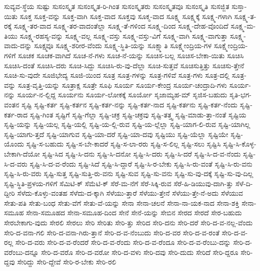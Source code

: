 {ಸುವ್ಯವ-ಸ್ಥೆಯ
ಸುಷ್ಟು
ಸುಸಂಸ್ಕೃತ
ಸುಸಂಸ್ಕೃತ-ರಿ-ಗಿಂತ
ಸುಸಂಸ್ಕೃತರು
ಸುಸಂಸ್ಕೃತವೂ
ಸುಸಂಸ್ಕೃತಿ
ಸುಸಜ್ಜಿತ
ಸುಸ್ತಾ-ಯಿತು
ಸೂಕ್ತ
ಸೂಕ್ತ-ವನ್ನು
ಸೂಕ್ತ-ವಾಗಿ
ಸೂಕ್ತ-ವಾದ
ಸೂಕ್ತವು
ಸೂಕ್ಮ-ವಾದ
ಸೂಕ್ಷ್ಮ
ಸೂಕ್ಷ್ಮಕ್ಕೆ
ಸೂಕ್ಷ್ಮ-ಗಳಾಗಿ
ಸೂಕ್ಷ್ಮ-ತ-ರಕ್ಕೆ
ಸೂಕ್ಷ್ಮ-ತರ-ವಾದ
ಸೂಕ್ಷ್ಮ-ತರ-ವಾದಂತೆಲ್ಲಾ
ಸೂಕ್ಷ್ಮ-ತೆ-ಗಳಿಂದ
ಸೂಕ್ಷ್ಮ-ದಿಂದ
ಸೂಕ್ಷ್ಮ-ದೇಹ-ವೊಂದಿದೆ
ಸೂಕ್ಷ್ಮ-ಮ-ತಿಯು
ಸೂಕ್ಷ್ಮ-ರಹಸ್ಯ-ವನ್ನು
ಸೂಕ್ಷ್ಮ-ವಲ್ಲ
ಸೂಕ್ಷ್ಮ-ವಸ್ತು
ಸೂಕ್ಷ್ಮ-ವಸ್ತು-ವಿಗೆ
ಸೂಕ್ಷ್ಮ-ವಾಗಿ
ಸೂಕ್ಷ್ಮ-ವಾಗುತ್ತಾ
ಸೂಕ್ಷ್ಮ-ವಾದು-ದನ್ನು
ಸೂಕ್ಷ್ಮವೂ
ಸೂಕ್ಷ್ಮ-ಶರೀರ-ವೆಂದು
ಸೂಕ್ಷ್ಮ-ಸ್ಥಿತಿ-ಯನ್ನು
ಸೂಕ್ಷ್ಮಾತಿ
ಸೂಕ್ಷ್ಮೇಂದ್ರಿಯ-ಗಳ
ಸೂಕ್ಷ್ಮೇಂದ್ರಿಯ-ಗಳಿಗೆ
ಸೂಚಕ
ಸೂಚಕ-ವಾಗಿದೆ
ಸೂಚ-ನೆ-ಗಳು
ಸೂಚ-ನೆ-ಯನ್ನು
ಸೂಚಿಸ-ಬಲ್ಲ
ಸೂಚಿಸ-ಬೇಕಾ-ಯಿತು
ಸೂಚಿಸಿ
ಸೂಚಿಸಿ-ದಂತೆ
ಸೂಚಿಸಿ-ದರು
ಸೂಚಿ-ಸಿದ್ದು
ಸೂಚಿಸಿ-ರು-ವು-ದೆಲ್ಲಾ
ಸೂಚಿ-ಸುತ್ತವೆ
ಸೂಚಿಸುತ್ತಿತ್ತು
ಸೂಚಿಸು-ತ್ತೇನೆ
ಸೂಚಿ-ಸು-ವುದೇ
ಸೂಜಿಭೇದ್ಯ
ಸೂಜಿ-ಯಿಂದ
ಸೂತ್ರ
ಸೂತ್ರ-ಗಳನ್ನು
ಸೂತ್ರ-ಗಳಿವೆ
ಸೂತ್ರ-ಗಳು
ಸೂತ್ರ-ದಲ್ಲಿ
ಸೂತ್ರ-ವನ್ನು
ಸೂತ್ರ-ವೃತ್ತಿ-ಯನ್ನು
ಸೂತ್ರಾಕ್ಷ
ಸೂತ್ರೇ
ಸೂಫಿ
ಸೂರ್ಯ
ಸೂರ್ಯ-ಕೇಂದ್ರ
ಸೂರ್ಯ-ಚಂದ್ರಾದಿ-ಗಳು
ಸೂರ್ಯ-ನನ್ನು
ಸೂರ್ಯ-ನ-ಲ್ಲಿದ್ದ
ಸೂರ್ಯನು
ಸೂರ್ಯ-ಲೋಕಕ್ಕೆ
ಸೂರ್ಯೋ
ಸೃಜಾಮ್ಯಹ-ಮ್
ಸೃಜಿಸ-ಬಹುದು
ಸೃತಿ-ಭಗ-ವಂತನ
ಸೃಷ್ಟಿ
ಸೃಷ್ಟಿ-ಕರ್ತ
ಸೃಷ್ಟಿ-ಕರ್ತನ
ಸೃಷ್ಟಿ-ಕರ್ತ-ನನ್ನು
ಸೃಷ್ಟಿ-ಕರ್ತ-ನಾದ
ಸೃಷ್ಟಿ-ಕರ್ತನು
ಸೃಷ್ಟಿ-ಕರ್ತ-ನೆಂದು
ಸೃಷ್ಟಿ-ಕರ್ತ-ರಾದ
ಸೃಷ್ಟಿ-ಗಿಂತ
ಸೃಷ್ಟಿಗೆ
ಸೃಷ್ಟಿ-ಗೆಲ್ಲಾ
ಸೃಷ್ಟಿ-ಚಕ್ರ
ಸೃಷ್ಟಿ-ಚಕ್ರವು
ಸೃಷ್ಟಿ-ತತ್ತ್ವ
ಸೃಷ್ಟಿ-ಮಾಡು-ತ್ತಾ-ನಂತೆ
ಸೃಷ್ಟಿಯ
ಸೃಷ್ಟಿ-ಯನ್ನು
ಸೃಷ್ಟಿ-ಯಲ್ಲ
ಸೃಷ್ಟಿ-ಯಲ್ಲಿ
ಸೃಷ್ಟಿ-ಯ-ಲ್ಲಿ-ರುವ
ಸೃಷ್ಟಿ-ಯ-ಲ್ಲೆಲ್ಲಾ
ಸೃಷ್ಟಿ-ಯಾಗ-ಲಿ-ರುವ
ಸೃಷ್ಟಿ-ಯಾಗಿಲ್ಲ
ಸೃಷ್ಟಿ-ಯಾಗು-ತ್ತದೆ
ಸೃಷ್ಟಿ-ಯಾಗುವ
ಸೃಷ್ಟಿ-ಯಾ-ದರೆ
ಸೃಷ್ಟಿ-ಯಾ-ದವು
ಸೃಷ್ಟಿಯು
ಸೃಷ್ಟಿ-ಯೆಲ್ಲಾ
ಸೃಷ್ಟಿಯೇ
ಸೃಷ್ಟಿ-ಯೊಂದು
ಸೃಷ್ಟಿ-ಸ-ಬಹುದು
ಸೃಷ್ಟಿ-ಸ-ಬೇ-ಕಾದರೆ
ಸೃಷ್ಟಿ-ಸ-ಲಾ-ರರು
ಸೃಷ್ಟಿ-ಸ-ಲಿಲ್ಲ
ಸೃಷ್ಟಿ-ಸಲು
ಸೃಷ್ಟಿಸಿ
ಸೃಷ್ಟಿ-ಸಿ-ಕೊಳ್ಳ-ಬೇಕಾಗಿ-ದೆಯೋ
ಸೃಷ್ಟಿ-ಸಿದ
ಸೃಷ್ಟಿ-ಸಿ-ದನು
ಸೃಷ್ಟಿ-ಸಿ-ದನೋ
ಸೃಷ್ಟಿ-ಸಿ-ದರು
ಸೃಷ್ಟಿ-ಸಿ-ದರೆ
ಸೃಷ್ಟಿ-ಸಿ-ದ-ವ-ನೆಂದು
ಸೃಷ್ಟಿ-ಸಿ-ದ-ವರು
ಸೃಷ್ಟಿ-ಸಿ-ದ-ವ-ರೆಂದು
ಸೃಷ್ಟಿ-ಸಿದೆ
ಸೃಷ್ಟಿ-ಸಿ-ದ್ದಾರೆ
ಸೃಷ್ಟಿ-ಸಿ-ರ-ಬೇಕು
ಸೃಷ್ಟಿ-ಸಿ-ರು-ವಂತೆ
ಸೃಷ್ಟಿ-ಸಿ-ರು-ವನು
ಸೃಷ್ಟಿ-ಸಿ-ರು-ವರು
ಸೃಷ್ಟಿ-ಸುತ್ತ
ಸೃಷ್ಟಿ-ಸುತ್ತಿ-ರು-ವನು
ಸೃಷ್ಟಿ-ಸುವ
ಸೃಷ್ಟಿ-ಸು-ವನು
ಸೃಷ್ಟಿ-ಸು-ವು-ದಕ್ಕೆ
ಸೃಷ್ಟಿ-ಸು-ವು-ದಿಲ್ಲ
ಸೃಷ್ಟಿ-ಸ್ಥಿತಿ-ಪ್ರಳಯ-ಗಳಿಗೆ
ಸೆಮಿಟಿ-ಕ್
ಸೆಮೆಟಿ-ಕ್
ಸೆರೆ-ಮ-ನೆಗೆ
ಸೆರೆ-ಸಿಕ್ಕಿ-ರುವ
ಸೆರೆ-ಹಿ-ಡಿಯುವು-ದಾಗಿ-ತ್ತು
ಸೆಳೆ-ದಿ-ದ್ದೀರಿ
ಸೆಳೆದು-ಕೊಳ್ಳು-ವಂತಹ
ಸೆಳೆದು-ದ-ಕ್ಕಾಗಿ
ಸೆಳೆಯು-ತ್ತಾರೆ
ಸೆಳೆಯು-ತ್ತೇನೆ
ಸೆಳೆಯು-ತ್ತೇ-ನೆ-ಅದು
ಸೆಳೆಯುವ
ಸೇತು-ಪತಿ
ಸೇತು-ಬಂಧ
ಸೇತು-ವೆಗೆ
ಸೇತು-ವೆ-ಯನ್ನು
ಸೇನಾ
ಸೇನಾ-ಚಲನೆ
ಸೇನಾ-ನಾ-ಯಕ-ನಾದ
ಸೇನಾ-ಶಕ್ತಿ
ಸೇನಾ-ಸಮೂಹ
ಸೇನಾ-ಸಮೂಹದ
ಸೇನಾ-ಸಮೂಹ-ದಿಂದ
ಸೇನೆ
ಸೇನೆ-ಯನ್ನು
ಸೇಬಿನ
ಸೇರದ
ಸೇರದೆ
ಸೇರ-ಬಹುದು
ಸೇರಬೇಕಾಗು-ವುದು
ಸೇರಲಿ
ಸೇರಲು
ಸೇರಿ
ಸೇರಿತು
ಸೇರಿ-ತ್ತು
ಸೇರಿದ
ಸೇರಿ-ದನು
ಸೇರಿ-ದರೆ
ಸೇರಿ-ದ-ವ-ನಲ್ಲ-ವೆಂದು
ಸೇರಿ-ದ-ವನಾ-ಗಲಿ
ಸೇರಿ-ದ-ವನಾ-ಗಿರು-ತ್ತಾನೆ
ಸೇರಿ-ದ-ವ-ನೆಂಬುದು
ಸೇರಿ-ದ-ವರ
ಸೇರಿ-ದ-ವ-ರಂತೆ
ಸೇರಿ-ದ-ವ-ರಲ್ಲ
ಸೇರಿ-ದ-ವರು
ಸೇರಿ-ದ-ವ-ರೆಂದರೆ
ಸೇರಿ-ದ-ವ-ರೆಂದು
ಸೇರಿ-ದ-ವ-ರೆಂದೂ
ಸೇರಿ-ದ-ವ-ರೆಂಬು-ದನ್ನು
ಸೇರಿ-ದ-ವರೆಂಬು-ದನ್ನೂ
ಸೇರಿ-ದ-ವರೊ
ಸೇರಿ-ದ-ವರೋ
ಸೇರಿ-ದ-ವಳು
ಸೇರಿ-ದವು
ಸೇರಿ-ದುದು
ಸೇರಿದೆ
ಸೇರಿ-ದ್ದರೂ
ಸೇರಿ-ದ್ದವು
ಸೇರಿದ್ದು
ಸೇರಿ-ದ್ದೇವೆ
ಸೇರಿ-ರ-ಬೇಕು
ಸೇರಿ-ರಲಿ
}
